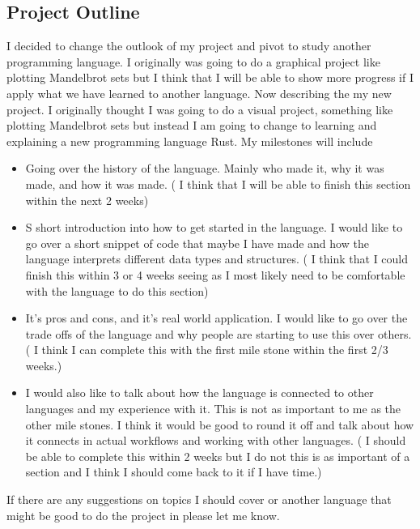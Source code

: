 \documentclass{article}
\theoremstyle{theorem}
\theoremstyle{definition}
\theoremstyle{remark}
\begin{document}
\subsection{Project Outline }
I decided to change the outlook of my project and pivot to study another programming language. I originally was going to do a graphical project like plotting Mandelbrot sets but I think that I will be able to show more progress if I apply what we have learned to another language. 
    Now describing the my new project. I originally thought I was going to do a visual project, something like plotting Mandelbrot sets but instead I am going to change to learning and explaining a new programming language Rust. My milestones will include 
    \begin{itemize}

\item Going over the history of the language. Mainly who made it, why it was made, and how it was made. ( I think that I will be able to finish this section within the next 2 weeks) 
\item S short introduction into how to get started in the language. I would like to go over a short snippet of code that maybe I have made and how the language interprets different data types and structures. ( I think that I could finish this within 3 or 4 weeks seeing as I most likely need to be comfortable with the language to do this section)
\item It’s pros and cons, and it's real world application. I would like to go over the trade offs of the language and why people are starting to use this over others. ( I think I can complete this with the first mile stone within the first 2/3 weeks.)
\item I would also like to talk about how the language is connected to other languages and my experience with it. This is not as important to me as the other mile stones. I think it would be good to round it off and talk about how it connects in actual workflows and working with other languages. ( I should be able to complete this within 2 weeks but I do not this is as important of a section and I think I should come back to it if I have time.)
\end{itemize}
If there are any suggestions on topics I should cover or another language that might be good to do the project in please let me know.
\end{document}
